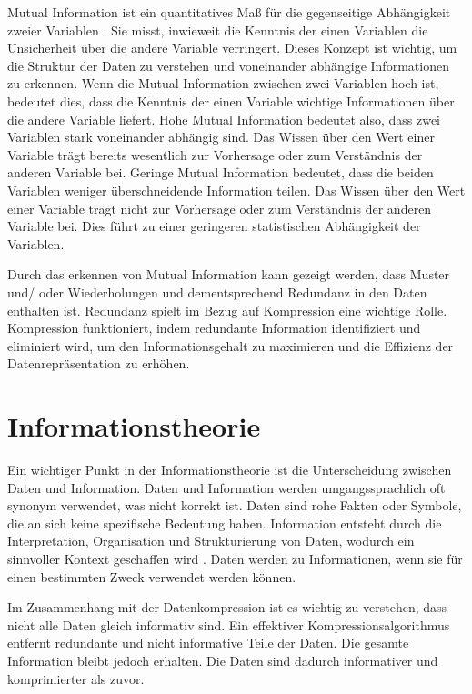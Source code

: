 \documentclass[conference]{IEEEtran}
\begin{document}
Mutual Information ist ein quantitatives Maß für die gegenseitige Abhängigkeit zweier
Variablen \cite{shannon}. 
Sie misst, inwieweit die Kenntnis der einen Variablen die Unsicherheit über die 
andere Variable verringert.
Dieses Konzept ist wichtig, um die Struktur der Daten zu verstehen und voneinander 
abhängige Informationen zu erkennen. 
Wenn die Mutual Information zwischen zwei Variablen hoch ist, bedeutet dies, dass die 
Kenntnis der einen Variable wichtige Informationen über die andere Variable liefert.
Hohe Mutual Information bedeutet also, dass zwei Variablen stark voneinander 
abhängig sind.
Das Wissen über den Wert einer Variable trägt bereits wesentlich zur Vorhersage
oder zum Verständnis der anderen Variable bei.
Geringe Mutual Information bedeutet, dass die beiden Variablen weniger überschneidende 
Information teilen.
Das Wissen über den Wert einer Variable trägt nicht zur
Vorhersage oder zum Verständnis der anderen Variable bei.
Dies führt zu einer geringeren statistischen Abhängigkeit der Variablen.

Durch das erkennen von Mutual Information kann gezeigt werden, dass Muster und/ oder
Wiederholungen und dementsprechend Redundanz in den Daten enthalten ist.
Redundanz spielt im Bezug auf Kompression eine wichtige Rolle.
Kompression funktioniert, indem redundante Information identifiziert und eliminiert 
wird, um den Informationsgehalt zu maximieren und die Effizienz der Datenrepräsentation 
zu erhöhen.


\section{Informationstheorie}

Ein wichtiger Punkt in der Informationstheorie ist die Unterscheidung zwischen 
Daten und Information. 
Daten und Information werden umgangssprachlich oft synonym verwendet, was 
nicht korrekt ist. 
Daten sind rohe Fakten oder Symbole, die an sich keine spezifische Bedeutung haben.
Information entsteht durch die Interpretation, Organisation und Strukturierung von Daten, 
wodurch ein sinnvoller Kontext geschaffen wird \cite{pieper}. 
Daten werden zu Informationen, wenn sie für einen bestimmten Zweck verwendet werden können.

Im Zusammenhang mit der Datenkompression ist es wichtig zu verstehen, dass 
nicht alle Daten gleich informativ sind. 
Ein effektiver Kompressionsalgorithmus entfernt redundante und nicht informative 
Teile der Daten. 
Die gesamte Information bleibt jedoch erhalten. 
Die Daten sind dadurch informativer und komprimierter als zuvor.
\end{document}
